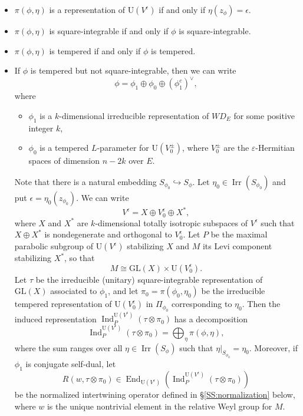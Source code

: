 \documentclass[11pt]{amsart}
\numberwithin{equation}{section}
\theoremstyle{plain}
\theoremstyle{definition}
\theoremstyle{remark}
\def\End{\operatorname{End}}
\def\Ind{\operatorname{Ind}}
\def\Irr{\operatorname{Irr}}
\def\GL{\mathrm{GL}}
\def\U{\mathrm{U}}
\def\WD{\mathit{WD}}
\begin{document}
\begin{itemize}
\item
$\pi(\phi,\eta)$ is a representation of $\U(V^{\epsilon})$ if and only if $\eta(z_\phi)  = \epsilon$.

\item $\pi(\phi,\eta)$ is square-integrable if and only if $\phi$ is square-integrable.

\item $\pi(\phi,\eta)$ is tempered if and only if $\phi$ is tempered.

\item
If $\phi$ is tempered but not square-integrable, then we can write
\[
 \phi = \phi_1 \oplus \phi_0 \oplus (\phi_1^c)^\vee,
\]
where
\begin{itemize}
 \item $\phi_1$ is a $k$-dimensional irreducible representation of $\WD_E$ for some positive integer $k$,
 \item $\phi_0$ is a tempered $L$-parameter for $\U(V_0^{\pm})$,
 where $V_0^{\pm}$ are the $\varepsilon$-Hermitian spaces of dimension $n-2k$ over $E$.
\end{itemize}
Note that there is a natural embedding $S_{\phi_0} \hookrightarrow S_\phi$.
Let $\eta_0 \in \Irr(S_{\phi_0})$ and put $\epsilon = \eta_0(z_{\phi_0})$.
We can write
\[
 V^\epsilon = X \oplus V_0^\epsilon \oplus X^*,
\]
where $X$ and $X^*$ are $k$-dimensional totally isotropic subspaces of $V^\epsilon$ such that $X \oplus X^*$ is nondegenerate and orthogonal to $V_0^\epsilon$.
Let $P$ be the maximal parabolic subgroup of $\U(V^\epsilon)$ stabilizing $X$ and $M$ its Levi component stabilizing $X^*$, so that 
\[
 M \cong \GL(X) \times \U(V_0^\epsilon).
\]
Let $\tau$ be the irreducible (unitary) square-integrable representation of $\GL(X)$ associated to $\phi_1$, 
and let $\pi_0 = \pi(\phi_0, \eta_0)$ be the irreducible tempered representation of $\U(V_0^\epsilon)$ in $\Pi_{\phi_0}$ corresponding to $\eta_0$.
Then the induced representation $\Ind^{\U(V^\epsilon)}_P(\tau \otimes \pi_0)$ has a decomposition 
\[
 \Ind^{\U(V^\epsilon)}_P(\tau \otimes \pi_0) = \bigoplus_\eta \pi(\phi, \eta), 
\]
where the sum ranges over all $\eta \in \Irr(S_{\phi})$ such that $\eta|_{S_{\phi_0}} = \eta_0$.
Moreover, if $\phi_1$ is conjugate self-dual, let 
\[
 R(w, \tau \otimes \pi_0) \in \End_{\U(V^\epsilon)}(\Ind^{\U(V^\epsilon)}_P(\tau \otimes \pi_0))
\]
be the normalized intertwining operator defined in \S \ref{SS:normalization} below, where $w$ is the unique nontrivial element in the relative Weyl group for $M$.

\end{itemize}
\end{document}
